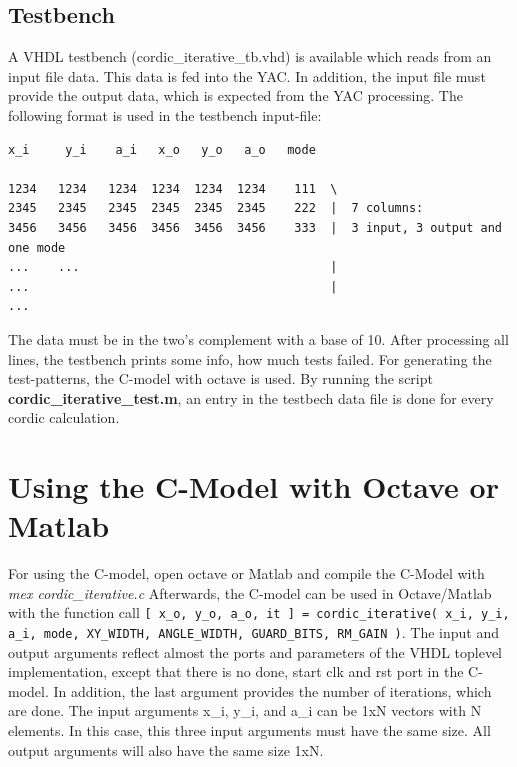 \documentclass[a4paper, 12pt, notitlepage]{report}
\newcommand{\file}[1]{\textbf{#1}}
\begin{document}
\section{Testbench}
A VHDL testbench (cordic\_iterative\_tb.vhd) is available which reads from an input file
data. This data is fed into the YAC. In addition, the input file must
provide the output data, which is expected from the YAC processing.
The following format is used in the testbench input-file:
\begin{verbatim}
x_i     y_i    a_i   x_o   y_o   a_o   mode

1234   1234   1234  1234  1234  1234    111  \
2345   2345   2345  2345  2345  2345    222  |  7 columns:
3456   3456   3456  3456  3456  3456    333  |  3 input, 3 output and one mode
...    ...                                   |
...                                          |
...
\end{verbatim}
The data must be in the two's complement with a base of 10.
After processing all lines, the testbench prints some info, how much
tests failed.\newline
For generating the test-patterns, the C-model with octave is used. By running
the script \file{cordic\_iterative\_test.m}, an entry 
in the testbech data file is done for every cordic calculation.


\chapter{Using the C-Model with Octave or Matlab}
For using the C-model, open octave or Matlab and compile the C-Model
with \newline
\textit{mex cordic\_iterative.c}
Afterwards, the C-model can be used in Octave/Matlab with the function call\newline
{\tt [ x\_o, y\_o, a\_o, it ] = cordic\_iterative( x\_i, y\_i, a\_i, mode, XY\_WIDTH, ANGLE\_WIDTH,
GUARD\_BITS, RM\_GAIN )}.\newline
The input and output arguments reflect almost the ports and parameters of the 
VHDL toplevel implementation, except that there is no done, start clk and rst port 
in the C-model. In addition, the last argument provides the number of iterations,
which are done.\newline \newline
The input arguments x\_i, y\_i, and a\_i can be 1xN vectors with N elements.
In this case, this three input arguments must have the same size. All
output arguments will also have the same size 1xN.
\end{document}
